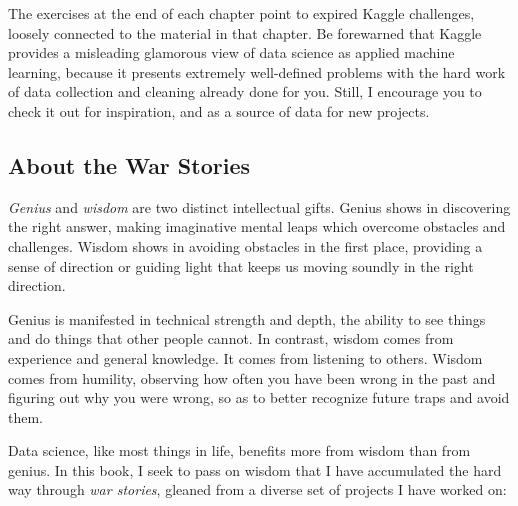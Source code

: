 \documentclass[10pt]{article}
\begin{document}
The exercises at the end of each chapter point to expired Kaggle challenges, loosely connected to the material in that chapter. Be forewarned that Kaggle provides a misleading glamorous view of data science as applied machine learning, because it presents extremely well-defined problems with the hard work of data collection and cleaning already done for you. Still, I encourage you to check it out for inspiration, and as a source of data for new projects.

\subsection{About the War Stories}
\textit{Genius} and \textit{wisdom} are two distinct intellectual gifts. Genius shows in discovering the right answer, making imaginative mental leaps which overcome obstacles and challenges. Wisdom shows in avoiding obstacles in the first place, providing a sense of direction or guiding light that keeps us moving soundly in the right direction.

Genius is manifested in technical strength and depth, the ability to see things and do things that other people cannot. In contrast, wisdom comes from experience and general knowledge. It comes from listening to others. Wisdom comes from humility, observing how often you have been wrong in the past and figuring out why you were wrong, so as to better recognize future traps and avoid them.

Data science, like most things in life, benefits more from wisdom than from genius. In this book, I seek to pass on wisdom that I have accumulated the hard way through \textit{war stories}, gleaned from a diverse set of projects I have worked on:
\end{document}
